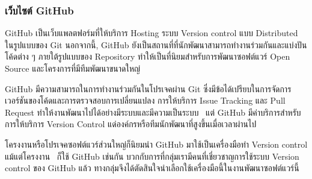 \documentclass[12pt,one side,openright,a4paper]{cpe-thesis-th}
\newcommand{\thaijustify}[1]{%
  \par\hspace{30pt}\justifying
  #1
}
\begin{document}
        \subsubsection{เว็บไซต์ GitHub}
            \thaijustify{
                GitHub เป็นเว็บแพลตฟอร์มที่ให้บริการ Hosting ระบบ Version control แบบ Distributed ในรูปแบบของ Git นอกจากนี้, GitHub ยังเป็นสถานที่ที่นักพัฒนาสามารถทำงานร่วมกันและแบ่งปันโค้ดต่าง ๆ ภายใต้รูปแบบของ Repository ทำให้เป็นที่นิยมสำหรับการพัฒนาซอฟต์แวร์ Open Source และโครงการที่มีทีมพัฒนาขนาดใหญ่~\cite{github}
            }
            \thaijustify{
                GitHub มีความสามารถในการทำงานร่วมกันในโปรเจคผ่าน Git ซึ่งมีข้อได้เปรียบในการจัดการเวอร์ชันของโค้ดและการตรวจสอบการเปลี่ยนแปลง การให้บริการ Issue Tracking และ Pull Request ทำให้งานพัฒนาไปได้อย่างมีระบบและมีความเป็นระบบ~\cite{github, chacon14} แต่ GitHub มีค่าบริการสำหรับการให้บริการ Version Control แด่องค์กรหรือทีมนักพัฒนาที่สูงขึ้นเมื่อเวลาผ่านไป~\cite{githubprice}
            }
            \thaijustify{
                โครงงานหรือโปรเจคซอฟต์แวร์ส่วนใหญ่ก็นิยมนำ GitHub มาใช้เป็นเครื่องมือทำ Version control แม้แต่โครงงาน~\cite{nattawat20pgs} ก็ใช้ GitHub เช่นกัน บวกกับการที่กลุ่มเรามีคนที่เชี่ยวชาญการใช้ระบบ Version control ของ GitHub แล้ว ทางกลุ่มจึงได้ตัดสินใจนำเลือกใช้เครื่องมือนี้ในงานพัฒนาซอฟต์แวร์นี้
            }
\end{document}

